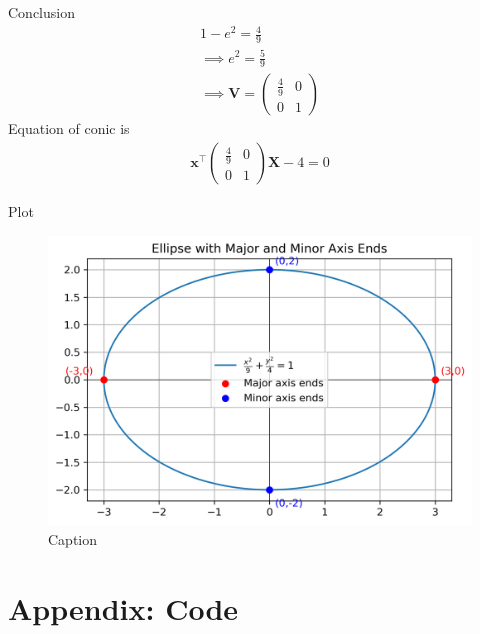 \documentclass{beamer}
\numberwithin{equation}{section}
\theoremstyle{remark}
\let\vec\mathbf
\begin{document}
\begin{frame}{Conclusion}
\begin{align}
    1-e^2=\frac{4}{9}\\
    \implies e^2=\frac{5}{9}\\
    \implies \vec{V}= \begin{pmatrix}
        \frac{4}{9} & 0\\
        0 & 1
    \end{pmatrix}
\end{align}
Equation of conic is 
\begin{align}
   \vec{x}^\top \begin{pmatrix}
        \frac{4}{9} & 0\\
        0 & 1
    \end{pmatrix} \vec{X}-4=0
\end{align}
\end{frame}

\begin{frame}{Plot}
    \begin{figure}
        \centering
        \includegraphics[width=0.8\columnwidth]{figs/01.png}
        \caption{Caption}
        \label{fig:placeholder}
    \end{figure}
\end{frame}

\section*{Appendix: Code}
\end{document}
